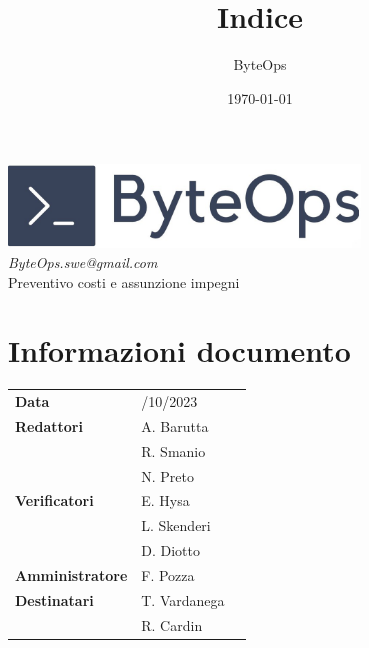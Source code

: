 \documentclass{article}
\title{\textbf{\fontsize{30}{6}\selectfont Indice}}
\author{\fontsize{14}{6}\selectfont ByteOps}
\date{\today}
\begin{document}
\pagestyle{fancy}
\begin{center}
\includegraphics[width = 0.7\textwidth]{../Images/logo.png} \\
\vspace{0.2cm}
\textcolor[RGB]{60, 60, 60}{\textit{ByteOps.swe@gmail.com}} \\
\vspace{1cm}
\fontsize{16}{6}\selectfont Preventivo costi e assunzione impegni \\
\vspace{0.5cm}
\end{center}

\section*{Informazioni documento}
\def\arraystretch{1.2}
\begin{tabular}{>{\raggedleft\arraybackslash}p{}|>{\raggedright\arraybackslash}p{}c}
\hline
\addlinespace
    \textbf{Data} & 25/10/2023 \vspace{10pt} \\
    \textbf{Redattori} & A. Barutta \\ & R. Smanio \\ & N. Preto \vspace{10pt} \\
    \textbf{Verificatori} & E. Hysa \\ & L. Skenderi \\ & D. Diotto \vspace{10pt} \\
    \textbf{Amministratore} & F. Pozza \vspace{10pt} \\
    \textbf{Destinatari} & T. Vardanega \\ & R. Cardin \vspace{10pt} \\
\end{tabular}
\pagebreak 

\end{document}
